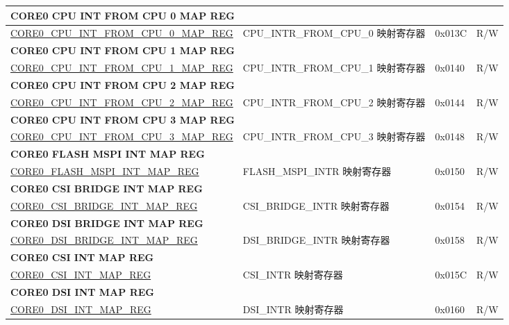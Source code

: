 \begin{longtable}{ | p{8.7cm} | p{6.2cm} | p{1.3cm} | p{1cm} | }
\multicolumn{4}{|l|}{\textbf{CORE0 CPU INT FROM CPU 0 MAP REG}} \\ \hline
\hyperref[regdesc:CORE0CPUINTFROMCPU0MAPREG]{CORE0\_CPU\_INT\_FROM\_CPU\_0\_MAP\_REG} & CPU\_INTR\_FROM\_CPU\_0 映射寄存器 & 0x013C & R/W \\ \hline
\multicolumn{4}{|l|}{\textbf{CORE0 CPU INT FROM CPU 1 MAP REG}} \\ \hline
\hyperref[regdesc:CORE0CPUINTFROMCPU1MAPREG]{CORE0\_CPU\_INT\_FROM\_CPU\_1\_MAP\_REG} & CPU\_INTR\_FROM\_CPU\_1 映射寄存器 & 0x0140 & R/W \\ \hline
\multicolumn{4}{|l|}{\textbf{CORE0 CPU INT FROM CPU 2 MAP REG}} \\ \hline
\hyperref[regdesc:CORE0CPUINTFROMCPU2MAPREG]{CORE0\_CPU\_INT\_FROM\_CPU\_2\_MAP\_REG} & CPU\_INTR\_FROM\_CPU\_2 映射寄存器 & 0x0144 & R/W \\ \hline
\multicolumn{4}{|l|}{\textbf{CORE0 CPU INT FROM CPU 3 MAP REG}} \\ \hline
\hyperref[regdesc:CORE0CPUINTFROMCPU3MAPREG]{CORE0\_CPU\_INT\_FROM\_CPU\_3\_MAP\_REG} & CPU\_INTR\_FROM\_CPU\_3 映射寄存器 & 0x0148 & R/W \\ \hline
\multicolumn{4}{|l|}{\textbf{CORE0 FLASH MSPI INT MAP REG}} \\ \hline
\hyperref[regdesc:CORE0FLASHMSPIINTMAPREG]{CORE0\_FLASH\_MSPI\_INT\_MAP\_REG} & FLASH\_MSPI\_INTR 映射寄存器 & 0x0150 & R/W \\ \hline
\multicolumn{4}{|l|}{\textbf{CORE0 CSI BRIDGE INT MAP REG}} \\ \hline
\hyperref[regdesc:CORE0CSIBRIDGEINTMAPREG]{CORE0\_CSI\_BRIDGE\_INT\_MAP\_REG} & CSI\_BRIDGE\_INTR 映射寄存器 & 0x0154 & R/W \\ \hline
\multicolumn{4}{|l|}{\textbf{CORE0 DSI BRIDGE INT MAP REG}} \\ \hline
\hyperref[regdesc:CORE0DSIBRIDGEINTMAPREG]{CORE0\_DSI\_BRIDGE\_INT\_MAP\_REG} & DSI\_BRIDGE\_INTR 映射寄存器 & 0x0158 & R/W \\ \hline
\multicolumn{4}{|l|}{\textbf{CORE0 CSI INT MAP REG}} \\ \hline
\hyperref[regdesc:CORE0CSIINTMAPREG]{CORE0\_CSI\_INT\_MAP\_REG} & CSI\_INTR 映射寄存器 & 0x015C & R/W \\ \hline
\multicolumn{4}{|l|}{\textbf{CORE0 DSI INT MAP REG}} \\ \hline
\hyperref[regdesc:CORE0DSIINTMAPREG]{CORE0\_DSI\_INT\_MAP\_REG} & DSI\_INTR 映射寄存器 & 0x0160 & R/W \\ \hline


\end{longtable}
